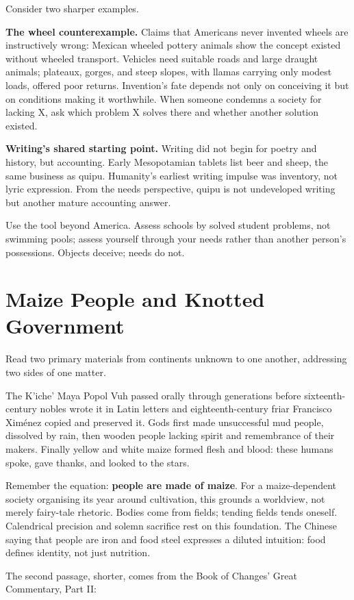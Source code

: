 Consider two sharper examples.

\textbf{The wheel counterexample.} Claims that Americans never invented wheels are instructively wrong: Mexican wheeled pottery animals show the concept existed without wheeled transport. Vehicles need suitable roads and large draught animals; plateaux, gorges, and steep slopes, with llamas carrying only modest loads, offered poor returns. Invention's fate depends not only on conceiving it but on conditions making it worthwhile. When someone condemns a society for lacking X, ask which problem X solves there and whether another solution existed.

\textbf{Writing's shared starting point.} Writing did not begin for poetry and history, but accounting. Early Mesopotamian tablets list beer and sheep, the same business as quipu. Humanity's earliest writing impulse was inventory, not lyric expression. From the needs perspective, quipu is not undeveloped writing but another mature accounting answer.

Use the tool beyond America. Assess schools by solved student problems, not swimming pools; assess yourself through your needs rather than another person's possessions. Objects deceive; needs do not.

\section{Maize People and Knotted Government}
Read two primary materials from continents unknown to one another, addressing two sides of one matter.

The K'iche' Maya Popol Vuh passed orally through generations before sixteenth-century nobles wrote it in Latin letters and eighteenth-century friar Francisco Ximénez copied and preserved it. Gods first made unsuccessful mud people, dissolved by rain, then wooden people lacking spirit and remembrance of their makers. Finally yellow and white maize formed flesh and blood: these humans spoke, gave thanks, and looked to the stars.

Remember the equation: \textbf{people are made of maize}. For a maize-dependent society organising its year around cultivation, this grounds a worldview, not merely fairy-tale rhetoric. Bodies come from fields; tending fields tends oneself. Calendrical precision and solemn sacrifice rest on this foundation. The Chinese saying that people are iron and food steel expresses a diluted intuition: food defines identity, not just nutrition.

The second passage, shorter, comes from the Book of Changes' Great Commentary, Part II:

